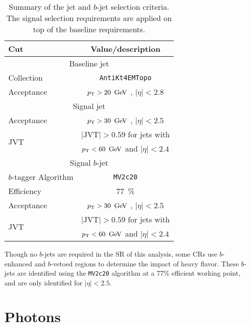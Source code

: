 \begin{table}[bh!]
\begin{center}
    \begin{tabular}{l|c}
      \hline
      Cut            & Value/description \\
      \hline
      \hline
      \multicolumn{2}{c}{Baseline jet} \\
      \hline
      Collection     & \texttt{AntiKt4EMTopo} \\
      Acceptance     & $\pt > 20\,\GeV$ , $|\eta |<2.8$ \\
      \hline
      \multicolumn{2}{c}{Signal jet} \\
      \hline
      Acceptance     & $\pt > 30\,\GeV$ , $|\eta | < 2.5$ \\ 
      \multirow{2}{*}{JVT}      & $|\mathrm{JVT}|>0.59$ for jets with \\
                                & $\pt <60\,\GeV$ and $|\eta | < 2.4$ \\
      \hline
      \multicolumn{2}{c}{Signal $b$-jet} \\
      \hline 
      $b$-tagger Algorithm      & \texttt{MV2c20} \\
      Efficiency                & $77$~\% \\
      Acceptance                & $\pt > 30\,\GeV$ , $|\eta | < 2.5$ \\ 
      \multirow{2}{*}{JVT}      & $|\mathrm{JVT}|>0.59$ for jets with \\
                                & $\pt <60\,\GeV$ and $|\eta | < 2.4$ \\
      \hline
      \hline
\end{tabular}
\end{center}
\caption{Summary of the jet and $b$-jet selection criteria. The signal selection
  requirements are applied on top of the baseline requirements. }
\label{tab:jetsdef}
\end{table}

Though no $b$-jets are required in the \ac{SR} of this analysis, some \acp{CR} use $b$-enhanced and $b$-vetoed regions to determine the impact of heavy flavor. These $b$-jets are identified using the \texttt{MV2c20} algorithm at a 77\% efficient working point, and are only identified for $|\eta|<2.5$. 


\section{Photons}

